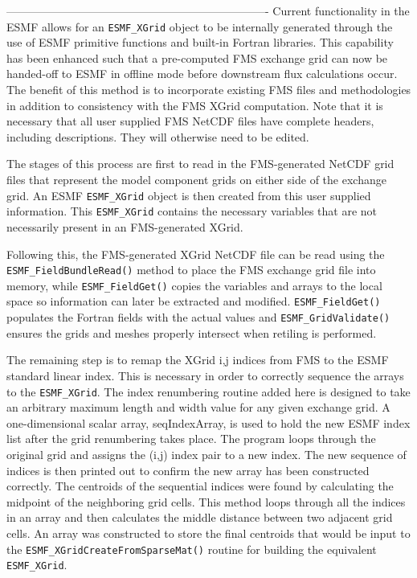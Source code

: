 
\label{sec:xgrid:offline}
----------------------------------------------------------------------
Current functionality in the ESMF allows for an {\tt ESMF\_XGrid} object to be internally generated 
through the use of ESMF primitive functions and built-in Fortran libraries. This capability has been 
enhanced such that a pre-computed FMS exchange grid can now be handed-off to ESMF in offline mode 
before downstream flux calculations occur. The benefit of this method is to incorporate existing FMS 
files and methodologies in addition to consistency with the FMS XGrid computation. Note that it is 
necessary that all user supplied FMS NetCDF files have complete headers, including descriptions. They 
will otherwise need to be edited.

The stages of this process are first to read in the FMS-generated NetCDF grid files that  
represent the model component grids on either side of the exchange grid. An ESMF {\tt ESMF\_XGrid} 
object is then created from this user supplied information. This {\tt ESMF\_XGrid} contains the 
necessary variables that are not necessarily present in an FMS-generated XGrid. 

Following this, the FMS-generated XGrid NetCDF file can be read using the {\tt ESMF\_FieldBundleRead()} 
method to place the FMS exchange grid file into memory, while {\tt ESMF\_FieldGet()} copies the variables 
and arrays to the local space so information can later be extracted and modified.  {\tt ESMF\_FieldGet()} 
populates the Fortran fields with the actual values and {\tt ESMF\_GridValidate()} ensures the grids and 
meshes properly intersect when retiling is performed.

The remaining step is to remap the XGrid i,j indices from FMS to the ESMF standard linear index. This is
necessary in order to correctly sequence the arrays to the {\tt ESMF\_XGrid}.  The index renumbering
routine added here is designed to take an arbitrary maximum length and width value for any given exchange 
grid.  A one-dimensional scalar array, seqIndexArray, is used to hold the new ESMF index list after the 
grid renumbering takes place.  The program loops through the original grid and assigns the (i,j) index 
pair to a new index.  The new sequence of indices is then printed out to confirm the new array has been 
constructed correctly.  The centroids of the sequential indices were found by calculating the midpoint of 
the neighboring grid cells.  This method loops through all the indices in an array and then calculates the 
middle distance between two adjacent grid cells.  An array was constructed to store the final centroids 
that would be input to the {\tt ESMF\_XGridCreateFromSparseMat()} routine for building the equivalent 
{\tt ESMF\_XGrid}.
